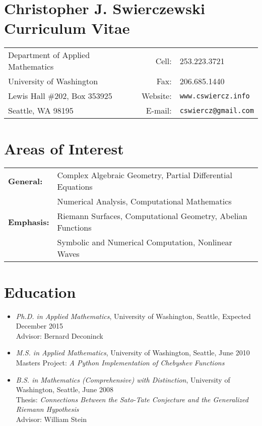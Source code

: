 \documentclass{article}
\begin{document}

\section*{Christopher J. Swierczewski \hspace{4.9cm} Curriculum Vitae}

\begin{tabular}{lrl}
  Department of Applied Mathematics \hspace{5cm} & Cell: & 253.223.3721 \\
  University of Washington                       & Fax:     & 206.685.1440 \\
  Lewis Hall \#202, Box 353925        & Website: & \tt www.cswiercz.info \\
  Seattle, WA 98195                   & E-mail:  & \tt cswiercz@gmail.com
\end{tabular}




\section*{Areas of Interest}

\begin{tabular}{ll}
  \bf General: & Complex Algebraic Geometry, Partial Differential Equations \\
         & Numerical Analysis, Computational Mathematics \\
  \bf Emphasis: & Riemann Surfaces, Computational Geometry, Abelian Functions\\
                & Symbolic and Numerical Computation, Nonlinear Waves
\end{tabular}



\section*{Education}



\begin{itemize}
  \item {\it Ph.D. in Applied Mathematics}, University of Washington,
    Seattle, Expected December 2015 \\ Advisor: Bernard Deconinck
  \item {\it M.S. in Applied Mathematics}, University of Washington,
    Seattle, June 2010 \\ Masters Project: {\it A Python Implementation
      of Chebyshev Functions}
  \item {\it B.S. in Mathematics (Comprehensive) with Distinction},
    University of Washington, Seattle, June 2008 \\ Thesis: {\it
      Connections Between the Sato-Tate Conjecture and the Generalized
      Riemann Hypothesis} \\ Advisor: William Stein
\end{itemize}
\end{document}

